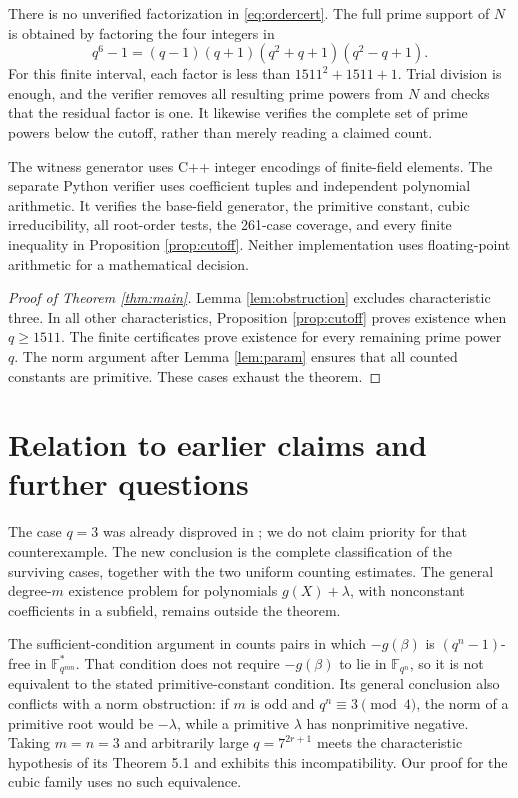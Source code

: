 \documentclass[11pt]{article}
\theoremstyle{remark}\newtheorem{remark}[theorem]{Remark}
\newcommand{\F}{\mathbb F}
\begin{document}
There is no unverified factorization in \eqref{eq:ordercert}. The full prime support of $N$ is obtained by factoring the four integers in
\[
 q^6-1=(q-1)(q+1)(q^2+q+1)(q^2-q+1).
\]
For this finite interval, each factor is less than $1511^2+1511+1$. Trial division is enough, and the verifier removes all resulting prime powers from $N$ and checks that the residual factor is one. It likewise verifies the complete set of prime powers below the cutoff, rather than merely reading a claimed count.

The witness generator uses C++ integer encodings of finite-field elements. The separate Python verifier uses coefficient tuples and independent polynomial arithmetic. It verifies the base-field generator, the primitive constant, cubic irreducibility, all root-order tests, the 261-case coverage, and every finite inequality in Proposition \ref{prop:cutoff}. Neither implementation uses floating-point arithmetic for a mathematical decision.

\begin{proof}[Proof of Theorem \ref{thm:main}]
Lemma \ref{lem:obstruction} excludes characteristic three. In all other characteristics, Proposition \ref{prop:cutoff} proves existence when $q\ge1511$. The finite certificates prove existence for every remaining prime power $q$. The norm argument after Lemma \ref{lem:param} ensures that all counted constants are primitive. These cases exhaust the theorem.
\end{proof}

\section{Relation to earlier claims and further questions}

The case $q=3$ was already disproved in \cite{S}; we do not claim priority for that counterexample. The new conclusion is the complete classification of the surviving cases, together with the two uniform counting estimates. The general degree-$m$ existence problem for polynomials $g(X)+\lambda$, with nonconstant coefficients in a subfield, remains outside the theorem.

The sufficient-condition argument in \cite[Section 5]{S} counts pairs in which $-g(\beta)$ is $(q^n-1)$-free in $\F_{q^{mn}}^*$. That condition does not require $-g(\beta)$ to lie in $\F_{q^n}$, so it is not equivalent to the stated primitive-constant condition. Its general conclusion also conflicts with a norm obstruction: if $m$ is odd and $q^n\equiv3\pmod4$, the norm of a primitive root would be $-\lambda$, while a primitive $\lambda$ has nonprimitive negative. Taking $m=n=3$ and arbitrarily large $q=7^{2r+1}$ meets the characteristic hypothesis of its Theorem 5.1 and exhibits this incompatibility. Our proof for the cubic family uses no such equivalence.
\end{document}
